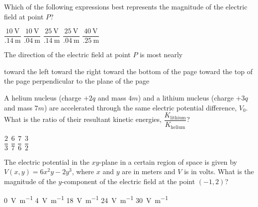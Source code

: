 \documentclass[12pt]{../oss-classkick-exam}
\begin{document}
\begin{questions}
  \question Which of the following expressions best represents the magnitude of
  the electric field at point $P$?
  \label{contour1}
  \begin{choices}
    \choice $\dfrac{\SI{10}{\volt}}{\SI{.14}{\metre}}$
    \choice $\dfrac{\SI{10}{\volt}}{\SI{.04}{\metre}}$
    \choice $\dfrac{\SI{25}{\volt}}{\SI{.14}{\metre}}$
    \choice $\dfrac{\SI{25}{\volt}}{\SI{.04}{\metre}}$
    \choice $\dfrac{\SI{40}{\volt}}{\SI{.25}{\metre}}$
  \end{choices}

  \question The direction of the electric field at point $P$ is most nearly
  \label{contour2}
  \begin{choices}
    \choice toward the left
    \choice toward the right
    \choice toward the bottom of the page
    \choice toward the top of the page
    \choice perpendicular to the plane of the page
  \end{choices}
  
  \uplevel{ \rule{\linewidth}{.5pt}}
  
  \question A helium nucleus (charge $+2q$ and mass $4m$) and a lithium nucleus
  (charge $+3q$ and mass $7m$) are accelerated through the same electric
  potential difference, $V_0$. What is the ratio of their resultant
  kinetic energies, $\dfrac{K_\text{lithium}}{K_\text{helium}}$?
  \begin{choices}
    \choice$\dfrac23$
    \choice$\dfrac67$
    \choice$\dfrac76$
    \choice$\dfrac32$
  \end{choices}
  
  \uplevel{\rule{\linewidth}{.5pt}}
  
  \question The electric potential in the $xy$-plane in a certain region of
  space is given by $V(x,y)=6x^2y-2y^3$, where $x$ and $y$ are in meters and
  $V$ is in volts. What is the magnitude of the $y$-component of the electric
  field at the point $(-1,2)$?
  \begin{choices}
    \choice\SI{0}{\volt\per\metre}
    \choice\SI{4}{\volt\per\metre}
    \choice\SI{18}{\volt\per\metre}
    \choice\SI{24}{\volt\per\metre}
    \choice\SI{30}{\volt\per\metre}
  \end{choices}
  \newpage
  


\end{questions}
\end{document}
